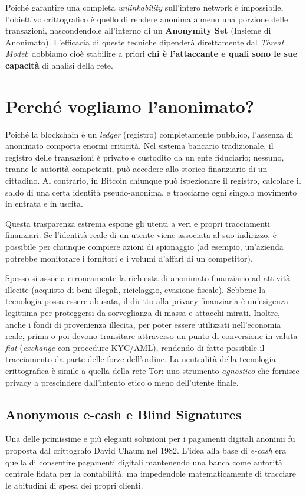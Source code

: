 Poiché garantire una completa \textit{unlinkability} sull'intero network è impossibile, l'obiettivo crittografico è quello di rendere anonima almeno una porzione delle transazioni, nascondendole all'interno di un \textbf{Anonymity Set} (Insieme di Anonimato). L'efficacia di queste tecniche dipenderà direttamente dal \textit{Threat Model}: dobbiamo cioè stabilire a priori \textbf{chi è l'attaccante e quali sono le sue capacità} di analisi della rete.

\section{Perché vogliamo l'anonimato?}
Poiché la blockchain è un \textit{ledger} (registro) completamente pubblico, l'assenza di anonimato comporta enormi criticità. Nel sistema bancario tradizionale, il registro delle transazioni è privato e custodito da un ente fiduciario; nessuno, tranne le autorità competenti, può accedere allo storico finanziario di un cittadino. Al contrario, in Bitcoin chiunque può ispezionare il registro, calcolare il saldo di una certa identità pseudo-anonima, e tracciarne ogni singolo movimento in entrata e in uscita.

Questa trasparenza estrema espone gli utenti a veri e propri tracciamenti finanziari. Se l'identità reale di un utente viene associata al suo indirizzo, è possibile per chiunque compiere azioni di spionaggio (ad esempio, un'azienda potrebbe monitorare i fornitori e i volumi d'affari di un competitor). 

Spesso si associa erroneamente la richiesta di anonimato finanziario ad attività illecite (acquisto di beni illegali, riciclaggio, evasione fiscale). Sebbene la tecnologia possa essere abusata, il diritto alla privacy finanziaria è un'esigenza legittima per proteggersi da sorveglianza di massa e attacchi mirati. Inoltre, anche i fondi di provenienza illecita, per poter essere utilizzati nell'economia reale, prima o poi devono transitare attraverso un punto di conversione in valuta \textit{fiat} (\textit{exchange} con procedure KYC/AML), rendendo di fatto possibile il tracciamento da parte delle forze dell'ordine. La neutralità della tecnologia crittografica è simile a quella della rete Tor: uno strumento \textit{agnostico} che fornisce privacy a prescindere dall'intento etico o meno dell'utente finale.

\subsection{Anonymous e-cash e Blind Signatures}
Una delle primissime e più eleganti soluzioni per i pagamenti digitali anonimi fu proposta dal crittografo David Chaum nel 1982. L'idea alla base di \textit{e-cash} era quella di consentire pagamenti digitali mantenendo una banca come autorità centrale fidata per la contabilità, ma impedendole matematicamente di tracciare le abitudini di spesa dei propri clienti.


